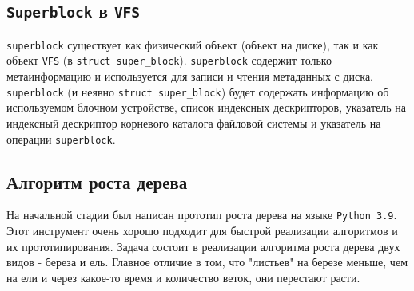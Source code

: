 \documentclass{article}
\begin{document}
    \subsection{\texttt{Superblock} в \texttt{VFS}}
    \texttt{superblock} существует как физический объект (объект на диске), так
    и как объект \texttt{VFS} (в \texttt{struct super\_block}).
    \texttt{superblock} содержит только метаинформацию и используется для
    записи и чтения метаданных с диска.
    \texttt{superblock} (и неявно \texttt{struct super\_block}) будет содержать
    информацию об используемом блочном устройстве, список индексных дескрипторов,
    указатель на индексный дескриптор корневого каталога файловой системы и
    указатель на операции \texttt{superblock}.

    \subsection{Алгоритм роста дерева}
    На начальной стадии был написан прототип роста дерева на языке
    \texttt{Python 3.9}. Этот инструмент очень хорошо подходит для быстрой
    реализации алгоритмов и их прототипирования.
    Задача состоит в реализации алгоритма роста дерева двух видов - береза и
    ель. Главное отличие в том, что "листьев" на березе меньше, чем на ели и
    через какое-то время и количество веток, они перестают расти.
\end{document}
